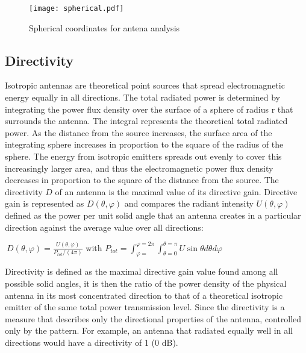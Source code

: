 \begin{figure}
	\begin{center}
		\texttt{[image: spherical.pdf]}
				\caption{\label{spherical}Spherical coordinates for antena analysis \cite{balanis}}
	\end{center}

\end{figure}


\subsection{Directivity}

Isotropic antennas are theoretical point sources that spread electromagnetic energy equally in all directions. The total radiated power is determined by integrating the power flux density over the surface of a sphere of radius r that surrounds the antenna. The integral represents the theoretical total radiated power. As the distance from the source increases, the surface area of the integrating sphere increases in proportion to the square of the radius of the sphere. The energy from isotropic emitters spreads out evenly to cover this increasingly larger area, and thus the electromagnetic power flux density decreases in proportion to the square of the distance from the source.
The directivity  $D$  of an antenna is the maximal value of its directive gain. Directive gain is represented as  $D \left(  \theta , \varphi  \right)$  and compares the radiant intensity  $U \left(  \theta , \varphi  \right)$  defined as the power per unit solid angle that an antenna creates in a particular direction against the average value over all directions:

$~D \left(  \theta , \varphi  \right) = \frac{ U \left(  \theta , \varphi  \right) }{P_{tot}/ \left( 4 \pi  \right) }$ with $P_{tot}= \int_{ \varphi =}^{ \varphi =2 \pi } \int_{ \theta =0}^{ \theta = \pi }U\sin  \theta d \theta d \varphi $

Directivity is defined as the maximal directive gain value found among all possible solid angles, it is then the ratio of the power density of the physical antenna in its most concentrated direction to that of a theoretical isotropic emitter of the same total power transmission level. Since the directivity is a measure that describes only the directional properties of the antenna, controlled only by the pattern. For example, an antenna that radiated equally well in all directions would have a directivity of 1 (0 dB).



